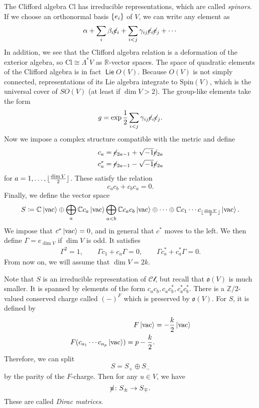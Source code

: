 \documentclass[leqno, openany]{memoir}
\DeclarePairedDelimiter{\floor}{\lfloor}{\rfloor}
\theoremstyle{definition}
\theoremstyle{remark}
\theoremstyle{plain}
\theoremstyle{definition}
\theoremstyle{remark}
\newcommand{\R}{\mathbb{R}}
\newcommand{\C}{\mathbb{C}}
\newcommand{\Z}{\mathbb{Z}}
\newcommand{\mc}[1]{\mathcal{#1}}
\newcommand{\mf}[1]{\mathfrak{#1}}
\newcommand{\mr}[1]{\mathrm{#1}}
\newcommand{\ms}[1]{\mathsf{#1}}
\newcommand{\on}[1]{\operatorname{#1}}
\begin{document}
The Clifford algebra $\mr{Cl}$ has irreducible representations, which are called \textit{spinors}. If we choose an orthonormal basis $\qty{e_i}$ of $V$, we can write any element as
\[ \alpha + \sum_i \beta_i \cancel{e}_i + \sum_{i < j} \gamma_{ij} \cancel{e}_i \cancel{e}_j + \cdots \]
In addition, we see that the Clifford algebra relation is a deformation of the exterior algebra, so $\mr{Cl} \cong \Lambda^* V$ as $\R$-vector spaces. The space of quadratic elements of the Clifford algebra is in fact $\on{\ms{Lie}} O(V)$. Because $O(V)$ is not simply connected, representations of its Lie algebra integrate to $\mr{Spin}(V)$, which is the universal cover of $SO(V)$ (at least if $\dim V > 2$). The group-like elements take the form
\[ g = \exp \frac{1}{2} \sum_{i<j} \gamma_{ij}\cancel{e}_i \cancel{e}_j. \]
Now we impose a complex structure compatible with the metric and define
\begin{align*}
c_a &= \cancel{e}_{2a-1} + \sqrt{-1} \cancel{e}_{2a} \\
c_a^* &= \cancel{e}_{2a-1} - \sqrt{-1} \cancel{e}_{2a} 
\end{align*}
for $a = 1, \ldots, \floor{\frac{\dim V}{2}}$.
These satisfy the relation
\[ c_a c_b + c_b c_a = 0. \]
Finally, we define the vector space
\[ S \coloneqq \C \ket{\mr{vac}} \oplus \bigoplus_a \C c_a \ket{\mr{vac}} \bigoplus_{a < b} \C c_a c_b \ket{\mr{vac}} \oplus \cdots \oplus \C c_1 \cdots c_{\floor{\frac{\dim V}{2}}} \ket{\mr{vac}}. \]
We impose that $c^* \ket{\mr{vac}} = 0$, and in general that $c^*$ moves to the left. We then define $\Gamma = e_{\dim V}$ if $\dim V$ is odd. It satisfies
\begin{align*}
\Gamma^2 = 1, \qquad \Gamma c_1 + c_a \Gamma = 0, \qquad \Gamma c_a^* + c_a^* \Gamma = 0. 
\end{align*}
From now on, we will assume that $\dim V = 2k$.

Note that $S$ is an irreducible representation of $\mc{Cl}$, but recall that $\mf{o}(V)$ is much smaller. It is spanned by elements of the form $c_a c_b, c_ac_b^*, c_a^* c_b^*$. There is a $\Z/2$-valued conserved charge called $(-)^F$ which is preserved by $\mf{o}(V)$. For $S$, it is defined by
\begin{align*}
  F \ket{\mr{vac}} &= -\frac{k}{2} \ket{\mr{vac}} \\
  F (c_{a_1} \cdots c_{a_p}\ket{\mr{vac}}) = p - \frac{k}{2}.
\end{align*}
Therefore, we can split
\[ S = S_+ \oplus S_- \]
by the parity of the $F$-charge. Then for any $u \in V$, we have
\[ \cancel{u} \colon S_{\pm} \to S_{\mp}. \]
These are called \textit{Dirac matrices}.
\end{document}
